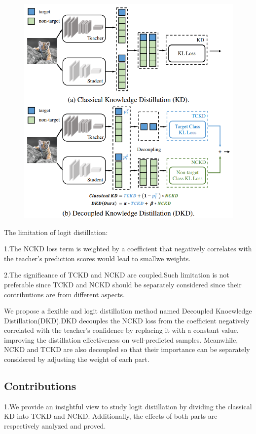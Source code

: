 \documentclass[11pt]{article}
\begin{document}
\begin{figure}[H]
	\centering
	\includegraphics[scale = 0.5]{102}
\end{figure}

The limitation of logit distillation:

\noindent1.The NCKD loss term is weighted by a coefficient that negatively correlates with the teacher's prediction scores would lead to smallwe weights.

\noindent2.The significance of TCKD and NCKD are coupled.Such limitation is not preferable since TCKD and NCKD should be separately considered since their contributions are from different aspects.

We propose a flexible and logit distillation method named Decoupled Knoewledge Distillation(DKD).DKD decouples the NCKD loss from the coefficient negatively correlated with the teacher’s confidence by replacing it with a constant value, improving the distillation effectiveness on well-predicted samples. Meanwhile, NCKD and TCKD are also decoupled so that their importance can be separately considered by adjusting the weight of each part.

\subsection{Contributions}
1.We provide an insightful view to study logit distillation by dividing the classical KD into TCKD and NCKD. Additionally, the effects of both parts are respectively analyzed and proved.
\end{document}
